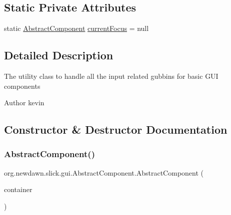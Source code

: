 \subsection*{Static Private Attributes}
\begin{DoxyCompactItemize}
\item 
static \mbox{\hyperlink{classorg_1_1newdawn_1_1slick_1_1gui_1_1_abstract_component}{Abstract\+Component}} \mbox{\hyperlink{classorg_1_1newdawn_1_1slick_1_1gui_1_1_abstract_component_aa30f22e9d9dc79cef2e36d40a4435f0e}{current\+Focus}} = null
\end{DoxyCompactItemize}


\subsection{Detailed Description}
The utility class to handle all the input related gubbins for basic G\+UI components

\begin{DoxyAuthor}{Author}
kevin 
\end{DoxyAuthor}


\subsection{Constructor \& Destructor Documentation}
\mbox{\label{classorg_1_1newdawn_1_1slick_1_1gui_1_1_abstract_component_a8ee8763659ee9d2ac917601c98dfe907}} 
\subsubsection{\texorpdfstring{Abstract\+Component()}{AbstractComponent()}}
{\footnotesize\ttfamily org.\+newdawn.\+slick.\+gui.\+Abstract\+Component.\+Abstract\+Component (\begin{DoxyParamCaption}\item[{\mbox{\hyperlink{interfaceorg_1_1newdawn_1_1slick_1_1gui_1_1_g_u_i_context}{G\+U\+I\+Context}}}]{container }\end{DoxyParamCaption})\hspace{0.3cm}{\ttfamily [inline]}}

